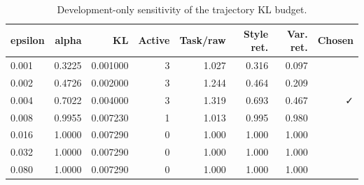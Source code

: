 \begin{table}[t]
\centering
\small
\caption{Development-only sensitivity of the trajectory KL budget.}
\label{tab:trsd-epsilon}
\begin{tabular}{lrrrrrrr}
\toprule
epsilon & alpha & KL & Active & Task/raw & Style ret. & Var. ret. & Chosen \\
\midrule
0.001 & 0.3225 & 0.001000 & 3 & 1.027 & 0.316 & 0.097 &  \\
0.002 & 0.4726 & 0.002000 & 3 & 1.244 & 0.464 & 0.209 &  \\
0.004 & 0.7022 & 0.004000 & 3 & 1.319 & 0.693 & 0.467 & ✓ \\
0.008 & 0.9955 & 0.007230 & 1 & 1.013 & 0.995 & 0.980 &  \\
0.016 & 1.0000 & 0.007290 & 0 & 1.000 & 1.000 & 1.000 &  \\
0.032 & 1.0000 & 0.007290 & 0 & 1.000 & 1.000 & 1.000 &  \\
0.080 & 1.0000 & 0.007290 & 0 & 1.000 & 1.000 & 1.000 &  \\
\bottomrule
\end{tabular}
\end{table}
